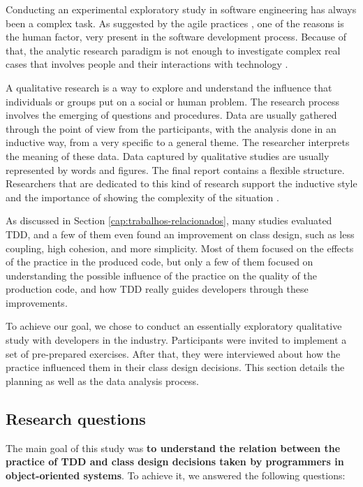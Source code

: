 \documentclass[times]{elsarticle}
\begin{document}
Conducting an experimental exploratory study in software engineering has always
been a complex task. As suggested by the agile practices \cite{AgileManifesto}, 
one of the reasons is the human factor, very present in 
the software development process. Because of that, the analytic research
paradigm is not enough to investigate complex real cases that involves people
and their interactions with technology \cite{guidelines-case-study}.

A qualitative research is a way to explore and understand the influence that
individuals or groups put on a social or human problem. The research process
involves the emerging of questions and procedures. Data are usually gathered through
the point of view from the participants, with the analysis done in an inductive
way, from a very specific to a general theme. The researcher interprets
the meaning of these data. Data captured by qualitative studies are usually
represented by words and figures. The final report contains a flexible structure.
Researchers that are dedicated to this kind of research support the inductive style and
the importance of showing the complexity of the situation \cite{creswell}.

As discussed in Section \ref{cap:trabalhos-relacionados}, many studies evaluated
TDD, and a few of them even found an improvement on class design, such as
less coupling, high cohesion, and more simplicity. Most of them focused on
the effects of the practice in the produced code, but only a few of them focused on understanding
the possible influence of the practice on the quality of the production code, 
and how TDD really guides developers through these improvements.

To achieve our goal, we chose to conduct an essentially 
exploratory qualitative study with developers in the industry. Participants
were invited to implement a set of pre-prepared exercises. After that,
they were interviewed about how the practice influenced them in their
class design decisions. This section details the planning as well as
the data analysis process.


\subsection{Research questions}

The main goal of this study was \textbf{to understand the relation between
the practice of TDD and class design decisions taken by programmers in object-oriented
systems}. To achieve it, we answered the following questions:
\end{document}

